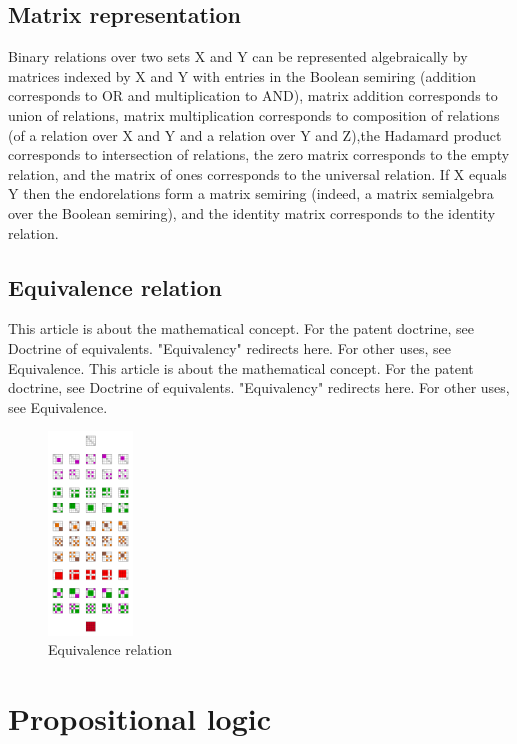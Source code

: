 \documentclass{article}
\begin{document}
\subsection{Matrix representation}
 Binary relations over two sets X and Y can be represented algebraically by matrices indexed by X and Y with entries in the Boolean semiring (addition corresponds to OR and multiplication to AND), matrix addition corresponds to union of relations, matrix multiplication corresponds to composition of relations (of a relation over X and Y and a relation over Y and Z),the Hadamard product corresponds to intersection of relations, the zero matrix corresponds to the empty relation, and the matrix of ones corresponds to the universal relation. If X equals Y then the endorelations form a matrix semiring (indeed, a matrix semialgebra over the Boolean semiring), and the identity matrix corresponds to the identity relation. 
 \subsection{Equivalence relation}
 This article is about the mathematical concept. For the patent doctrine, see Doctrine of equivalents.
"Equivalency" redirects here. For other uses, see Equivalence.
This article is about the mathematical concept. For the patent doctrine, see Doctrine of equivalents.
"Equivalency" redirects here. For other uses, see Equivalence.
\begin{figure}[h]
\includegraphics[width=0.2\textwidth]{sq.png}
\caption{Equivalence relation}
\end{figure}
\newpage
\section{Propositional logic} 
\end{document}
